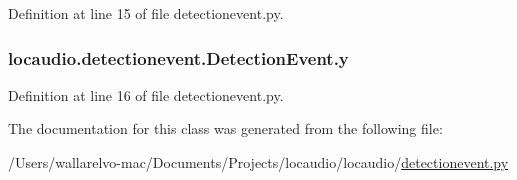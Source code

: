 Definition at line 15 of file detectionevent.\-py.

\hypertarget{classlocaudio_1_1detectionevent_1_1DetectionEvent_aab867d871d3ab2bc608936ab64051b56}{
\subsubsection[{y}]{\setlength{\rightskip}{0pt plus 5cm}locaudio.\-detectionevent.\-Detection\-Event.\-y}}\label{classlocaudio_1_1detectionevent_1_1DetectionEvent_aab867d871d3ab2bc608936ab64051b56}


Definition at line 16 of file detectionevent.\-py.



The documentation for this class was generated from the following file\-:\begin{DoxyCompactItemize}
\item 
/\-Users/wallarelvo-\/mac/\-Documents/\-Projects/locaudio/locaudio/\hyperlink{detectionevent_8py}{detectionevent.\-py}\end{DoxyCompactItemize}
